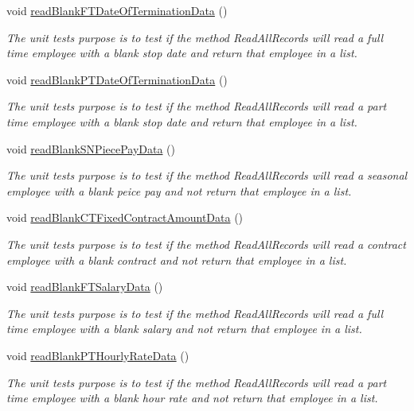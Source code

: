 \begin{DoxyCompactItemize}
void \hyperlink{class_file_i_o_tests_1_1_file_i_o_tests_a3c37b99e11e5fa0d3d44197c74c7dd2d}{read\+Blank\+F\+T\+Date\+Of\+Termination\+Data} ()
\begin{DoxyCompactList}\small\item\em The unit test\textquotesingle{}s purpose is to test if the method Read\+All\+Records will read a full time employee with a blank stop date and return that employee in a list. \end{DoxyCompactList}\item 
void \hyperlink{class_file_i_o_tests_1_1_file_i_o_tests_a196aabfeea5baa15b483e8ce4a658d18}{read\+Blank\+P\+T\+Date\+Of\+Termination\+Data} ()
\begin{DoxyCompactList}\small\item\em The unit test\textquotesingle{}s purpose is to test if the method Read\+All\+Records will read a part time employee with a blank stop date and return that employee in a list. \end{DoxyCompactList}\item 
void \hyperlink{class_file_i_o_tests_1_1_file_i_o_tests_a2662a873c3a9f56d949c0d1ad1ad2efc}{read\+Blank\+S\+N\+Piece\+Pay\+Data} ()
\begin{DoxyCompactList}\small\item\em The unit test\textquotesingle{}s purpose is to test if the method Read\+All\+Records will read a seasonal employee with a blank peice pay and not return that employee in a list. \end{DoxyCompactList}\item 
void \hyperlink{class_file_i_o_tests_1_1_file_i_o_tests_a1e89fba1e790dd6d8ecc86da746635a7}{read\+Blank\+C\+T\+Fixed\+Contract\+Amount\+Data} ()
\begin{DoxyCompactList}\small\item\em The unit test\textquotesingle{}s purpose is to test if the method Read\+All\+Records will read a contract employee with a blank contract and not return that employee in a list. \end{DoxyCompactList}\item 
void \hyperlink{class_file_i_o_tests_1_1_file_i_o_tests_a46a28774767e6ad2578f36c793206451}{read\+Blank\+F\+T\+Salary\+Data} ()
\begin{DoxyCompactList}\small\item\em The unit test\textquotesingle{}s purpose is to test if the method Read\+All\+Records will read a full time employee with a blank salary and not return that employee in a list. \end{DoxyCompactList}\item 
void \hyperlink{class_file_i_o_tests_1_1_file_i_o_tests_ac0aecca931032054e68587984cd6562a}{read\+Blank\+P\+T\+Hourly\+Rate\+Data} ()
\begin{DoxyCompactList}\small\item\em The unit test\textquotesingle{}s purpose is to test if the method Read\+All\+Records will read a part time employee with a blank hour rate and not return that employee in a list. \end{DoxyCompactList}\end{DoxyCompactItemize}


